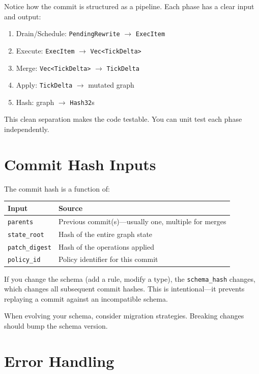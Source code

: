 \begin{commentary}
Notice how the commit is structured as a pipeline. Each phase has a clear input and output:

\begin{enumerate}
    \item Drain/Schedule: \texttt{PendingRewrite} $\rightarrow$ \texttt{ExecItem}
    \item Execute: \texttt{ExecItem} $\rightarrow$ \texttt{Vec<TickDelta>}
    \item Merge: \texttt{Vec<TickDelta>} $\rightarrow$ \texttt{TickDelta}
    \item Apply: \texttt{TickDelta} $\rightarrow$ mutated graph
    \item Hash: graph $\rightarrow$ \texttt{Hash32}s
\end{enumerate}

This clean separation makes the code testable. You can unit test each phase independently.
\end{commentary}

\section{Commit Hash Inputs}

The commit hash is a function of:

\begin{tabular}{ll}
\toprule
\textbf{Input} & \textbf{Source} \\
\midrule
\texttt{parents} & Previous commit(s)---usually one, multiple for merges \\
\texttt{state\_root} & Hash of the entire graph state \\
\texttt{patch\_digest} & Hash of the operations applied \\
\texttt{policy\_id} & Policy identifier for this commit \\
\bottomrule
\end{tabular}

\begin{watchout}
If you change the schema (add a rule, modify a type), the \texttt{schema\_hash} changes, which changes all subsequent commit hashes. This is intentional---it prevents replaying a commit against an incompatible schema.

When evolving your schema, consider migration strategies. Breaking changes should bump the schema version.
\end{watchout}

\section{Error Handling}

